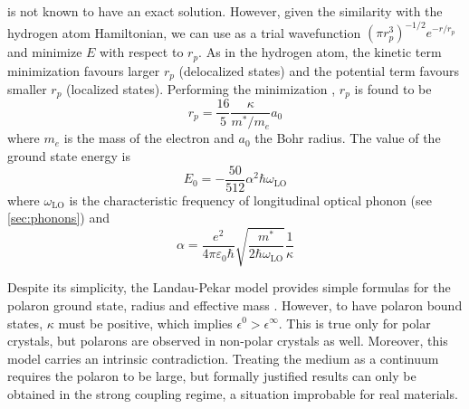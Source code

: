 is not known to have an exact solution. However, given the similarity with the hydrogen atom Hamiltonian, we can use as a trial wavefunction $(\pi r_p^3)^{-1/2} e^{-r/r_p}$ and minimize $E$ with respect to $r_p$. As in the hydrogen atom, the kinetic term minimization favours larger $r_p$ (delocalized states) and the potential term favours smaller $r_p$ (localized states). Performing the minimization \cite{alexandrov2010}, $r_p$ is found to be
\begin{equation}
    r_p = \frac{16}{5} \frac{\kappa}{m^*/m_e} a_0
\end{equation}
where $m_e$ is the mass of the electron and $a_0$ the Bohr radius. The value of the ground state energy is
\begin{equation}
    E_0 = -\frac{50}{512} \alpha^2 \hbar \omega_\text{LO}
\end{equation}
where $\omega_\text{LO}$ is the characteristic frequency of longitudinal optical phonon (see \cref{sec:phonons}) and
\begin{equation}
    \alpha = \frac{e^2}{4\pi\varepsilon_0\hbar} \sqrt{\frac{m^*}{2\hbar\omega_\text{LO}}} \frac{1}{\kappa}
\end{equation}

Despite its simplicity, the Landau-Pekar model provides simple formulas for the polaron ground state, radius and effective mass \cite{landau1948}. However, to have polaron bound states, $\kappa$ must be positive, which implies $\epsilon^0 > \epsilon^\infty$. This is true only for polar crystals, but polarons are observed in non-polar crystals as well. Moreover, this model carries an intrinsic contradiction. Treating the medium as a continuum requires the polaron to be large, but formally justified results can only be obtained in the strong coupling regime, a situation improbable for real materials.